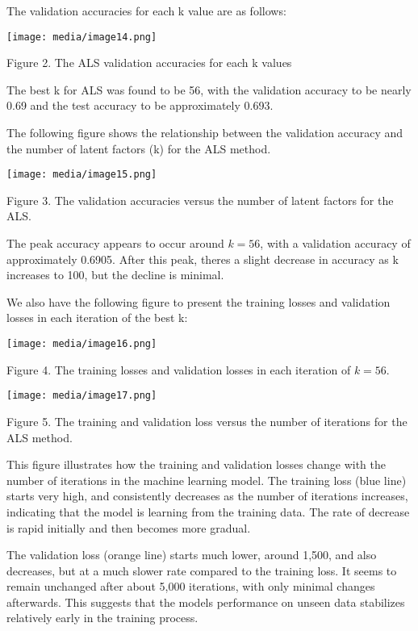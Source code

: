 The validation accuracies for each k value are as follows:

\texttt{[image: media/image14.png]}

Figure 2. The ALS validation accuracies for each k values

The best k for ALS was found to be 56, with the validation accuracy to
be nearly 0.69 and the test accuracy to be approximately 0.693.

The following figure shows the relationship between the validation
accuracy and the number of latent factors (k) for the ALS method.

\texttt{[image: media/image15.png]}

Figure 3. The validation accuracies versus the number of latent factors
for the ALS.

The peak accuracy appears to occur around \(k = 56\), with a validation
accuracy of approximately 0.6905. After this peak,
there\textquotesingle s a slight decrease in accuracy as k increases to
100, but the decline is minimal.

We also have the following figure to present the training losses and
validation losses in each iteration of the best k:

\texttt{[image: media/image16.png]}

Figure 4. The training losses and validation losses in each iteration of
\(k = 56\).

\texttt{[image: media/image17.png]}

Figure 5. The training and validation loss versus the number of
iterations for the ALS method.

This figure illustrates how the training and validation losses change
with the number of iterations in the machine learning model. The
training loss (blue line) starts very high, and consistently decreases
as the number of iterations increases, indicating that the model is
learning from the training data. The rate of decrease is rapid initially
and then becomes more gradual.

The validation loss (orange line) starts much lower, around 1,500, and
also decreases, but at a much slower rate compared to the training loss.
It seems to remain unchanged after about 5,000 iterations, with only
minimal changes afterwards. This suggests that the
model\textquotesingle s performance on unseen data stabilizes relatively
early in the training process.

